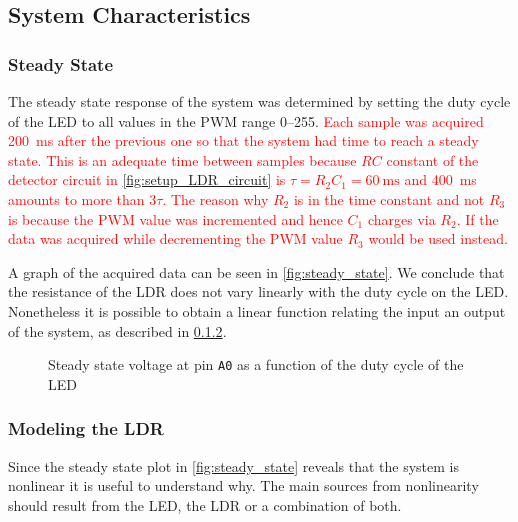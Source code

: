 \subsection{System Characteristics}
\label{sec:SystemCharacteristics}

\subsubsection{Steady State}
\label{sub:SteadyState}

The steady state response of the system was determined by setting the duty cycle of the LED to all values in the PWM range 0--255. \textcolor{red}{Each sample was acquired \SI{200}{\milli\second} after the previous one so that the system had time to reach a steady state. This is an adequate time between samples because $RC$ constant of the detector circuit in \autoref{fig:setup_LDR_circuit} is $\tau = R_2C_1 = \SI{60}{\milli\second}$ and \SI{400}{\milli\second} amounts to more than $3\tau$. The reason why $R_2$ is in the time constant and not $R_3$ is because the PWM value was incremented and hence $C_1$ charges via $R_2$. If the data was acquired while decrementing the PWM value $R_3$ would be used instead.}


A graph of the acquired data can be seen in \autoref{fig:steady_state}. We conclude that the resistance of the LDR does not vary linearly with the duty cycle on the LED. Nonetheless it is possible to obtain a linear function relating the input an output of the system, as described in \ref{subsubsec:LDR_model}.

\begin{figure}[h]
    \centering
    \resizebox{\textwidth}{!}{}
    \caption{Steady state voltage at pin \texttt{A0} as a function of the duty cycle of the LED}
    \label{fig:steady_state}
\end{figure}

\subsubsection{Modeling the LDR}
\label{subsubsec:LDR_model}

Since the steady state plot in \autoref{fig:steady_state} reveals that the system is nonlinear it is useful to understand why. The main sources from nonlinearity should result from the LED, the LDR or a combination of both.


